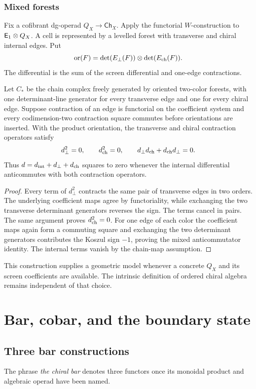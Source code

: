 \section{Mixed forests}
Fix a cofibrant dg-operad $Q_X\to\mathsf{Ch}_X$. Apply the functorial $W$-construction to $\mathsf E_1\otimes Q_X$. A cell is represented by a levelled forest with transverse and chiral internal edges. Put
\[
 \operatorname{or}(F)=\det(E_\perp(F))\otimes\det(E_{\mathrm{ch}}(F)).
\]
The differential is the sum of the screen differential and one-edge contractions.

\begin{theorem}
Let $C_*$ be the chain complex freely generated by oriented two-color forests, with one determinant-line generator for every transverse edge and one for every chiral edge.  Suppose contraction of an edge is functorial on the coefficient system and every codimension-two contraction square commutes before orientations are inserted.  With the product orientation, the transverse and chiral contraction operators satisfy
\[
 d_\perp^2=0,\qquad d_{\mathrm{ch}}^2=0,\qquad
 d_\perp d_{\mathrm{ch}}+d_{\mathrm{ch}}d_\perp=0.
\]
Thus $d=d_{\mathrm{int}}+d_\perp+d_{\mathrm{ch}}$ squares to zero whenever the internal differential anticommutes with both contraction operators.
\end{theorem}
\begin{proof}
Every term of $d_\perp^2$ contracts the same pair of transverse edges in two orders.  The underlying coefficient maps agree by functoriality, while exchanging the two transverse determinant generators reverses the sign.  The terms cancel in pairs.  The same argument proves $d_{\mathrm{ch}}^2=0$.  For one edge of each color the coefficient maps again form a commuting square and exchanging the two determinant generators contributes the Koszul sign $-1$, proving the mixed anticommutator identity.  The internal terms vanish by the chain-map assumption.
\end{proof}

This construction supplies a geometric model whenever a concrete $Q_X$ and its screen coefficients are available. The intrinsic definition of ordered chiral algebra remains independent of that choice.

\part{Bar, cobar, and the boundary state}


\chapter{Three bar constructions}
The phrase \emph{the chiral bar} denotes three functors once its monoidal product and algebraic operad have been named.

